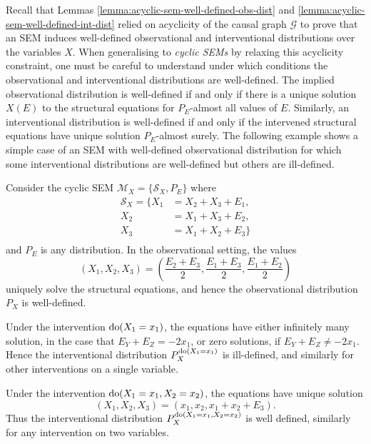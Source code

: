 Recall that Lemmas \ref{lemma:acyclic-sem-well-defined-obs-dist} and \ref{lemma:acyclic-sem-well-defined-int-dist} relied on acyclicity of the causal graph $\mathcal{G}$ to prove that an SEM induces well-defined observational and interventional distributions over the variables $X$. 
When generalising to \emph{cyclic SEMs} by relaxing this acyclicity constraint, one must be careful to understand under which conditions the observational and interventional distributions are well-defined.
The implied observational distribution is well-defined if and only if there is a unique solution $X(E)$ to the structural equations for $P_E$-almost all values of $E$. Similarly, an interventional distribution is well-defined if and only if the intervened structural equations have unique solution $P_E$-almost surely.
The following example shows a simple case of an SEM with well-defined observational distribution for which some interventional distributions are well-defined but others are ill-defined.

\begin{example}\label{example:causality-cyclic-invalid}
Consider the cyclic SEM $\mathcal{M}_X=\{\mathcal{S}_X, P_E\}$ where
%
\begin{align*}
\mathcal{S}_X = \big\{  X_1 &= X_2 + X_3 + E_1, \\
					    X_2 &= X_1 + X_3 + E_2, \\
					    X_3 &= X_1 + X_2 + E_3\big\} \\
\end{align*}
%
and $P_E$ is any distribution.
In the observational setting, the values 
\[(X_1, X_2, X_3) = \left(\frac{E_2 + E_3}{2}, \frac{E_1 + E_3}{2}, \frac{E_1 + E_2}{2}\right)\]
uniquely solve the structural equations, and hence the observational distribution $P_X$ is well-defined. 

Under the intervention $\operatorname{do}(X_1 = x_1)$, the equations have either infinitely many solution, in the case that $E_Y + E_Z = -2 x_1$, or zero solutions, if $E_Y + E_Z \not= -2 x_1$. 
Hence the interventional distribution $P_X^{\operatorname{do}(X_1 = x_1)}$ is ill-defined, and similarly for other interventions on a single variable.

Under the intervention $\operatorname{do}(X_1=x_1, X_2=x_2)$, the equations have unique solution 
\[(X_1, X_2, X_3) = \left(x_1, x_2, x_1 + x_2 + E_3 \right).\]
Thus the interventional distribution $P_X^{\operatorname{do}(X_1 = x_1, X_2=x_2)}$ is well defined, similarly for any intervention on two variables.
\end{example}

